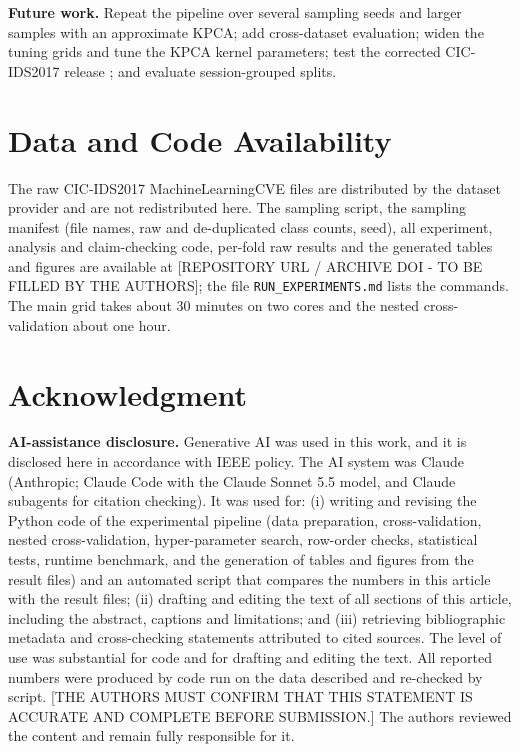 \documentclass{ieeeaccess}
\begin{document}
\textbf{Future work.} Repeat the pipeline over several sampling seeds and larger samples with an approximate KPCA; add cross-dataset evaluation; widen the tuning grids and tune the KPCA kernel parameters; test the corrected CIC-IDS2017 release \cite{engelen2021}; and evaluate session-grouped splits.


\section*{Data and Code Availability}
The raw CIC-IDS2017 MachineLearningCVE files are distributed by the dataset provider \cite{sharafaldin2018} and are not redistributed here. The sampling script, the sampling manifest (file names, raw and de-duplicated class counts, seed), all experiment, analysis and claim-checking code, per-fold raw results and the generated tables and figures are available at [REPOSITORY URL / ARCHIVE DOI - TO BE FILLED BY THE AUTHORS]; the file \texttt{RUN\_EXPERIMENTS.md} lists the commands. The main grid takes about 30 minutes on two cores and the nested cross-validation about one hour.

\section*{Acknowledgment}
\textbf{AI-assistance disclosure.} Generative AI was used in this work, and it is disclosed here in accordance with IEEE policy. The AI system was Claude (Anthropic; Claude Code with the Claude Sonnet 5.5 model, and Claude subagents for citation checking). It was used for: (i) writing and revising the Python code of the experimental pipeline (data preparation, cross-validation, nested cross-validation, hyper-parameter search, row-order checks, statistical tests, runtime benchmark, and the generation of tables and figures from the result files) and an automated script that compares the numbers in this article with the result files; (ii) drafting and editing the text of all sections of this article, including the abstract, captions and limitations; and (iii) retrieving bibliographic metadata and cross-checking statements attributed to cited sources. The level of use was substantial for code and for drafting and editing the text. All reported numbers were produced by code run on the data described and re-checked by script. [THE AUTHORS MUST CONFIRM THAT THIS STATEMENT IS ACCURATE AND COMPLETE BEFORE SUBMISSION.] The authors reviewed the content and remain fully responsible for it.
\end{document}
